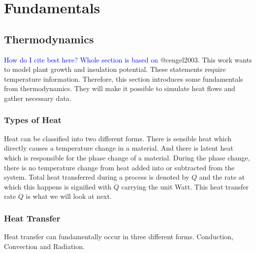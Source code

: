 \chapter{Fundamentals}
\label{chap:fundamentals}

\section{Thermodynamics}
\textcolor{Blue}{How do I cite best here? Whole section is based on} @cengel2003.
This work wants to model plant growth and insulation potential.
These statements require temperature information.
Therefore, this section introduces some fundamentals from thermodynamics.
They will make it possible to simulate heat flows and gather necessary data.



\subsection{Types of Heat}
Heat can be classified into two different forms.
There is sensible heat which directly causes a temperature change in a material.
And there is latent heat which is responsible for the phase change of a material.
During the phase change, there is no temperature change from heat added into or subtracted from the system.
Total heat transferred during a process is denoted by $Q$ and the rate at which this happens is signified with $\dot{Q}$ carrying the unit Watt.
This heat transfer rate $\dot{Q}$ is what we will look at next.

\subsection{Heat Transfer}
\label{sub:heat-transfer}
Heat transfer can fundamentally occur in three different forms.
Conduction, Convection and Radiation.

